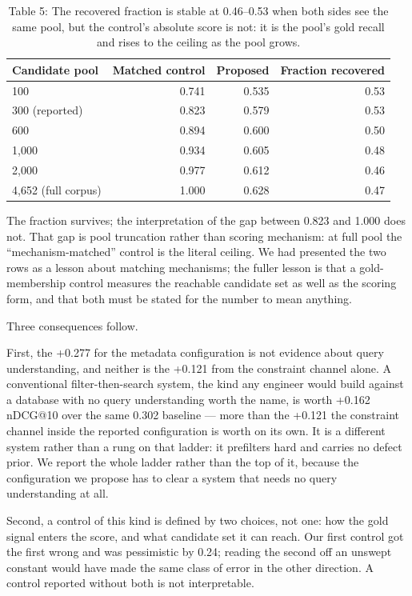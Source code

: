\documentclass[acmsmall]{acmart}
\begin{document}
\begin{table}[t]
\centering
\small
\caption{Table 5: The recovered fraction is stable at 0.46--0.53 when both sides see the same pool, but the control's absolute score is not: it is the pool's gold recall and rises to the ceiling as the pool grows.}
\begin{tabular}{lrrr}
\toprule
Candidate pool & Matched control & Proposed & Fraction recovered \\
\midrule
100 & 0.741 & 0.535 & 0.53 \\
300 (reported) & 0.823 & 0.579 & 0.53 \\
600 & 0.894 & 0.600 & 0.50 \\
1,000 & 0.934 & 0.605 & 0.48 \\
2,000 & 0.977 & 0.612 & 0.46 \\
4,652 (full corpus) & 1.000 & 0.628 & 0.47 \\
\bottomrule
\end{tabular}
\end{table}

The fraction survives; the interpretation of the gap between 0.823 and 1.000 does not. That gap is pool truncation rather than scoring mechanism: at full pool the ``mechanism-matched'' control is the literal ceiling. We had presented the two rows as a lesson about matching mechanisms; the fuller lesson is that a gold-membership control measures the reachable candidate set as well as the scoring form, and that both must be stated for the number to mean anything.

Three consequences follow.

First, the +0.277 for the metadata configuration is not evidence about query understanding, and neither is the +0.121 from the constraint channel alone. A conventional filter-then-search system, the kind any engineer would build against a database with no query understanding worth the name, is worth +0.162 nDCG@10 over the same 0.302 baseline --- more than the +0.121 the constraint channel inside the reported configuration is worth on its own. It is a different system rather than a rung on that ladder: it prefilters hard and carries no defect prior. We report the whole ladder rather than the top of it, because the configuration we propose has to clear a system that needs no query understanding at all.

Second, a control of this kind is defined by two choices, not one: how the gold signal enters the score, and what candidate set it can reach. Our first control got the first wrong and was pessimistic by 0.24; reading the second off an unswept constant would have made the same class of error in the other direction. A control reported without both is not interpretable.
\end{document}
